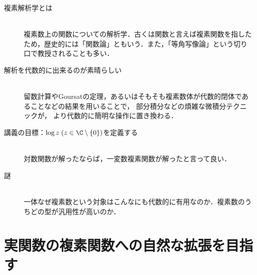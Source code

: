 \documentclass[uplatex, dvipdfmx]{jsreport}
\begin{document}
\begin{description}
    \item[複素解析学とは]\mbox{}\\
        複素数上の関数についての解析学．古くは関数と言えば複素関数を指したため，歴史的には「関数論」ともいう．また，「等角写像論」という切り口で教授されることも多い．
    \item[解析を代数的に出来るのが素晴らしい]\mbox{}\\
        留数計算やGoursatの定理，あるいはそもそも複素数体が代数的閉体であることなどの結果を用いることで，
        部分積分などの煩雑な微積分テクニックが，
        より代数的に簡明な操作に置き換わる．
    \item[講義の目標：$\log z\;(z\in\C\setminus\{0\})$を定義する]\mbox{}\\
        対数関数が解ったならば，一変数複素関数が解ったと言って良い．
    \item[謎]\mbox{}\\
        一体なぜ複素数という対象はこんなにも代数的に有用なのか．複素数のうちどの型が汎用性が高いのか．
\end{description}

\section{実関数の複素関数への自然な拡張を目指す}
\end{document}
